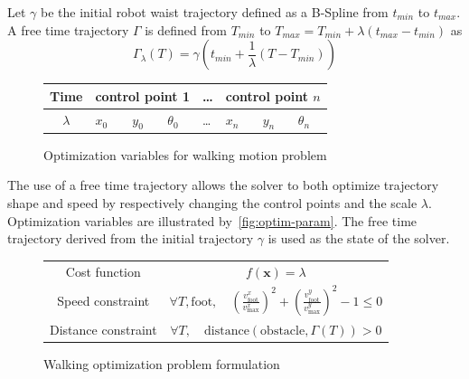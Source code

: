 \documentclass[conference,final,a4paper,twocolumn,9pt]{IEEEtran}
\begin{document}
Let $\gamma$ be the initial robot waist trajectory defined as a
B-Spline from $t_{min}$ to $t_{max}$. A free time trajectory $\Gamma$
is defined from $T_{min}$ to \linebreak $T_{max} = T_{min} + \lambda
(t_{max} - t_{min})$ as
\begin{equation}
  \Gamma_{\lambda} (T) = \gamma (t_{min} + \frac{1}{\lambda} (T -
  T_{min}))
\end{equation}

\begin{figure}[ht!]
  \begin{center}
    \begin{tabular}{|c|l l l| l |l l l|}
      \hline
      Time
      & \multicolumn{3}{|c|}{control point 1}
      & \ldots
      & \multicolumn{3}{|c|}{control point $n$}\\
      \hline
      $\lambda$
      & $x_0$ & $y_0$ & $\theta_0$
      & \ldots
      & $x_n$ & $y_n$ & $\theta_n$\\
      \hline
    \end{tabular}
  \end{center}
  \caption{Optimization variables for walking motion problem\label{fig:optim-param}}
\end{figure}


The use of a free time trajectory allows the solver to both optimize
trajectory shape and speed by respectively changing the control points
and the scale $\lambda$. Optimization variables are illustrated
by~\autoref{fig:optim-param}. The free time trajectory derived from
the initial trajectory $\gamma$ is used as the state of the solver.


\begin{figure}[ht!]
  \begin{center}
    \begin{tabular}{|c|c|}
      \hline Cost function & $f(\mathbf{x}) = \lambda$\\ Speed
      constraint & $\forall T, \text{foot},\quad
      (\frac{v_{\text{foot}}^{x}}{v_{\text{max}}^{x}})^2 +
      (\frac{v_{\text{foot}}^{y}}{v_{\text{max}}^{y}})^2 - 1 \leq
      0$\\ Distance constraint & $\forall T,\quad\text{distance} (\text{obstacle},
      \Gamma (T)) > 0$\\ \hline
    \end{tabular}
    \caption{Walking optimization problem formulation\label{fig:pb-walking}}
  \end{center}
\end{figure}
\end{document}
